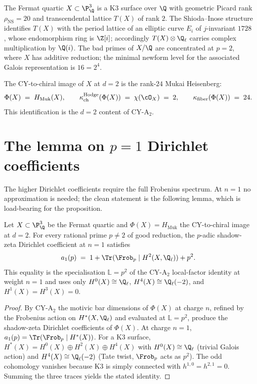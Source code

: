 The Fermat quartic $X \subset \P^3_\Q$ is a K3 surface over $\Q$ with geometric Picard rank $\rho_{\mathrm{NS}} = 20$ and transcendental lattice $T(X)$ of rank $2$. The Shioda--Inose structure identifies $T(X)$ with the period lattice of an elliptic curve $E_i$ of $j$-invariant $1728$, whose endomorphism ring is $\Z[i]$; accordingly $T(X) \otimes \Q_\ell$ carries complex multiplication by $\Q(i)$. The bad primes of $X / \Q$ are concentrated at $p = 2$, where $X$ has additive reduction; the minimal newform level for the associated Galois representation is $16 = 2^4$.

The CY-to-chiral image of $X$ at $d = 2$ is the rank-$24$ Mukai Heisenberg:
\[
 \Phi(X) \;=\; H_{\mathrm{Muk}}(X),
 \qquad \kappa_{\mathrm{ch}}^{\mathrm{Hodge}}(\Phi(X)) \;=\; \chi(\cO_X) \;=\; 2,
 \qquad \kappa_{\mathrm{fiber}}(\Phi(X)) \;=\; 24.
\]
This identification is the $d = 2$ content of CY-A$_2$.


\section{The lemma on \texorpdfstring{$p = 1$}{p = 1} Dirichlet coefficients}
\label{sec:padic-fermat-lemma}

The higher Dirichlet coefficients require the full Frobenius spectrum.
At $n = 1$ no approximation is needed; the clean statement is the
following lemma, which is load-bearing for the proposition.

\begin{lemma}
\label{lem:phi-k3-bar-shadow-hasse-weil-n1}
Let $X \subset \P^3_\Q$ be the Fermat quartic and $\Phi(X) = H_{\mathrm{Muk}}$ the CY-to-chiral image at $d = 2$. For every rational prime $p \neq 2$ of good reduction, the $p$-adic shadow-zeta Dirichlet coefficient at $n = 1$ satisfies
\[
 a_1(p) \;=\; 1 + \Tr(\Frob_p \mid H^2(X, \Q_\ell)) + p^2.
\]
This equality is the specialisation $\mathbb{L} = p^2$ of the CY-A$_2$ local-factor identity at weight $n = 1$ and uses only $H^0(X) \cong \Q_\ell$, $H^4(X) \cong \Q_\ell(-2)$, and $H^1(X) = H^3(X) = 0$.
\end{lemma}

\begin{proof}
By CY-A$_2$ the motivic bar dimensions of $\Phi(X)$ at charge $n$,
refined by the Frobenius action on $H^\ast(X, \Q_\ell)$ and evaluated at
$\mathbb{L} = p^2$, produce the shadow-zeta Dirichlet coefficients of
$\Phi(X)$. At charge $n = 1$, $a_1(p) = \Tr(\Frob_p \mid H^\ast(X))$.
For a K3 surface, $H^\ast(X) = H^0(X) \oplus H^2(X) \oplus H^4(X)$ with
$H^0(X) \cong \Q_\ell$ (trivial Galois action) and
$H^4(X) \cong \Q_\ell(-2)$ (Tate twist, $\Frob_p$ acts as $p^2$). The
odd cohomology vanishes because K3 is simply connected with
$h^{1,0} = h^{2,1} = 0$. Summing the three traces yields the stated
identity.
\end{proof}


